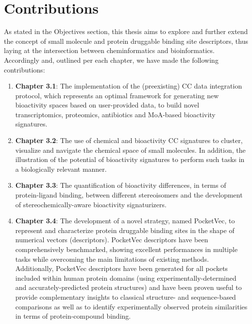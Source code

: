 \chapter{Contributions}
\label{Contributions}
\clearpage

As stated in the Objectives section, this thesis aims to explore and further extend the concept of small molecule and protein druggable binding site descriptors, thus laying at the intersection between cheminformatics and bioinformatics. Accordingly and, outlined per each chapter, we have made the following contributions:

\begin{enumerate}

\item \textbf{Chapter 3.1}: The implementation of the (preexisting) CC data integration protocol, which represents an optimal framework for generating new bioactivity spaces based on user-provided data, to build novel transcriptomics, proteomics, antibiotics and MoA-based bioactivity signatures. 

\item \textbf{Chapter 3.2}: The use of chemical and bioactivity CC signatures to cluster, visualize and navigate the chemical space of small molecules. In addition, the illustration of the potential of bioactivity signatures to perform such tasks in a biologically relevant manner.  

\item \textbf{Chapter 3.3}: The quantification of bioactivity differences, in terms of protein-ligand binding, between different stereoisomers and the development of stereochemically-aware bioactivity signaturizers. 

\item \textbf{Chapter 3.4}: The development of a novel strategy, named PocketVec, to represent and characterize protein druggable binding sites in the shape of numerical vectors (descriptors). PocketVec descriptors have been comprehensively benchmarked, showing excellent performances in multiple tasks while overcoming the main limitations of existing methods. Additionally, PocketVec descriptors have been generated for all pockets included within human protein domains (using experimentally-determined and accurately-predicted protein structures) and have been proven useful to provide complementary insights to classical structure- and sequence-based comparisons as well as to identify experimentally observed protein similarities in terms of protein-compound binding. 

\end{enumerate}